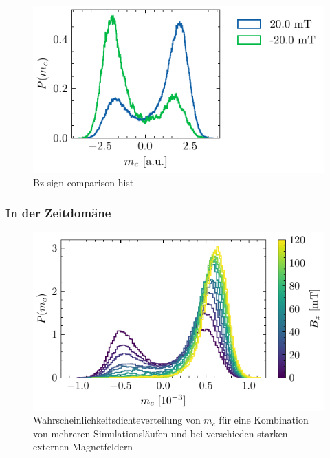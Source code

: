 \documentclass[main.tex]{subfiles}
\begin{document}






\begin{figure}[H]
    \centering
    \includegraphics{bilder/plots/Bz_sign_comparison/20mT_hist_comp.pdf}
    \caption{Bz sign comparison hist}\label{fig:bz-sign-hist}
\end{figure}



\subsubsection{In der Zeitdomäne}

\begin{figure}[H]
    \centering
    \includegraphics{bilder/plots/max_Bz/mc_hist.pdf}
    \caption{Wahrscheinlichkeitsdichteverteilung von \(m_c\) für eine Kombination von mehreren Simulationsläufen und bei verschieden starken externen Magnetfeldern}\label{fig:b-hist}    
\end{figure}
\end{document}
